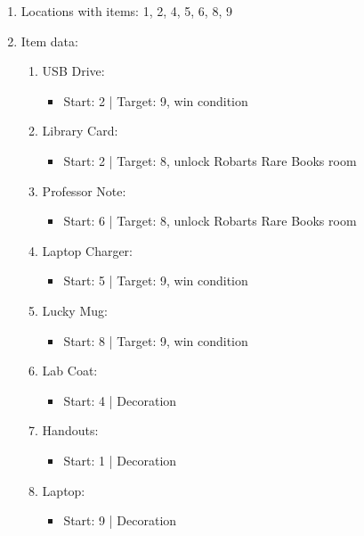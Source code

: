 \documentclass[11pt]{article}
\begin{document}
\begin{enumerate}
    \item Locations with items: 1, 2, 4, 5, 6, 8, 9
    \item Item data:
    \begin{enumerate}
        \item USB Drive:
        \begin{itemize}
            \item Start: 2 | Target: 9, win condition
        \end{itemize}
        \item Library Card:
        \begin{itemize}
            \item Start: 2 | Target: 8, unlock Robarts Rare Books room
        \end{itemize}
        \item Professor Note:
        \begin{itemize}
            \item Start: 6 | Target: 8, unlock Robarts Rare Books room
        \end{itemize}
        \item Laptop Charger:
        \begin{itemize}
            \item Start: 5 | Target: 9, win condition
        \end{itemize}
        \item Lucky Mug:
        \begin{itemize}
            \item Start: 8 | Target: 9, win condition
        \end{itemize}
        \item Lab Coat:
        \begin{itemize}
            \item Start: 4 | Decoration
        \end{itemize}
        \item Handouts:
        \begin{itemize}
            \item Start: 1 | Decoration
        \end{itemize}
        \item Laptop:
        \begin{itemize}
            \item Start: 9 | Decoration
        \end{itemize}
    \end{enumerate}

\end{enumerate}
\end{document}
